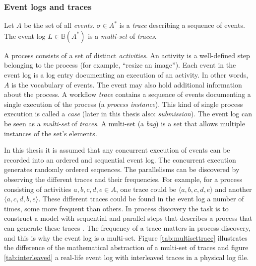 \subsubsection{Event logs and traces}

\label{sec:eventtheory}

\begin{definition}
Let $A$ be the set of all \emph{events}. 
$\sigma \in A^*$ is a \emph{trace} describing a sequence of events.
The event log $L \in \mathbb{B}(A^*)$ is a \emph{multi-set} of \emph{traces}.
\end{definition}

A process consists of a set of distinct \emph{activities}.
An activity is a well-defined step belonging to the process (for example, ``resize an image'').
Each event in the event log is a log entry documenting an execution of an activity.
In other words, $A$ is the vocabulary of events.
The event may also hold additional information about the process.
A workflow \emph{trace} contains a sequence of events documenting a single execution of the process (a \emph{process instance}).
This kind of single process execution is called a \emph{case} (later in this thesis also: \emph{submission}).
The event log can be seen as a \emph{multi-set} of \emph{traces}. 
A multi-set (a \emph{bag}) is a set that allows multiple instances of the set's elements. \cite{van2015extracting}

In this thesis it is assumed that any concurrent execution of events can be recorded into
an ordered and sequential event log. 
The concurrent execution generates randomly ordered sequences.
The parallelisms can be discovered by observing the different traces and their frequencies.
For example, for a process consisting of activities $a,b,c,d,e \in A$, one trace could be 
$\langle a,b,c,d,e \rangle$ and another $\langle a,c,d,b,e \rangle$.
These different traces could be found in the event log a number of times, some more frequent than others.
In process discovery the task is to construct a model with sequential and parallel steps 
that describes a process that can generate these traces \cite{van2013discovering}.
The frequency of a trace matters in process discovery, and this is why the event log is a multi-set.
Figure \ref{tab:multisettrace} illustrates the difference of the mathematical abstraction of a multi-set of traces and figure \ref{tab:interleaved} a real-life event log with interleaved traces in a physical log file.

